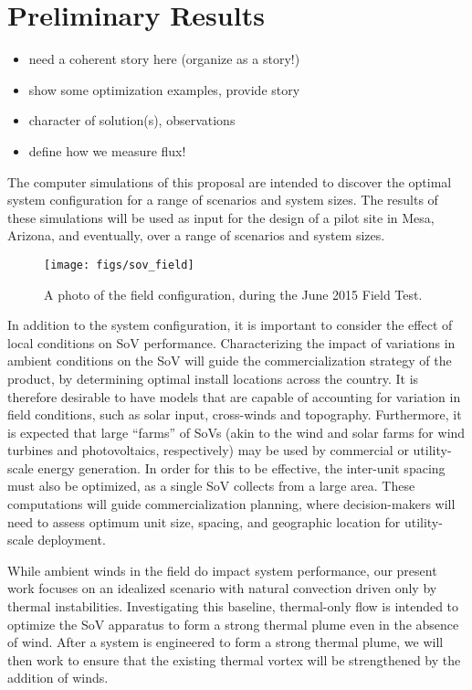  
\section{Preliminary Results}
\label{sec:results}

\begin{itemize}
\item need a coherent story here (organize as a story!)
\item show some optimization examples, provide story
\item character of solution(s), observations
\item define how we measure flux!
\end{itemize}

The computer simulations of this proposal are intended to discover the
optimal system configuration for a range of scenarios and system
sizes. The results of these simulations will be used as input for the
design of a pilot site in Mesa, Arizona, and eventually, over a range of
scenarios and system sizes. 

  \begin{figure}[!htb]
   \begin{center}
    \texttt{[image: figs/sov\_field]}
    \caption{A photo of the field configuration, during the June 2015
    Field Test.}
    \label{fig:field_real}
   \end{center}
  \end{figure}

In addition to the system configuration, it is important to consider the
effect of local conditions on SoV performance. Characterizing the impact
of variations in ambient conditions on the SoV will guide the
commercialization strategy of the product, by determining optimal
install locations across the country. It is therefore desirable to have
models 
that are capable of accounting for variation in field conditions, such
as solar input, cross-winds and topography. Furthermore, it is expected
that large ``farms'' of SoVs (akin to the wind and solar farms for wind
turbines and photovoltaics, respectively) may be used by commercial or
utility-scale energy generation. In order for this to be effective, 
the inter-unit spacing must also be optimized, as a single SoV collects
from a large area. These computations will guide commercialization
planning, where decision-makers will need to assess optimum unit size,
spacing, and geographic location for utility-scale deployment.  

While ambient winds in the field do impact system performance, our
present work focuses on an idealized scenario with natural convection
driven only by thermal instabilities. Investigating this baseline,
thermal-only flow is intended to optimize the SoV apparatus to form a
strong  thermal plume even in the absence of wind. After a system is
engineered to form a strong thermal plume, we will then work to ensure
that the existing thermal vortex will be strengthened by the addition of
winds.     

